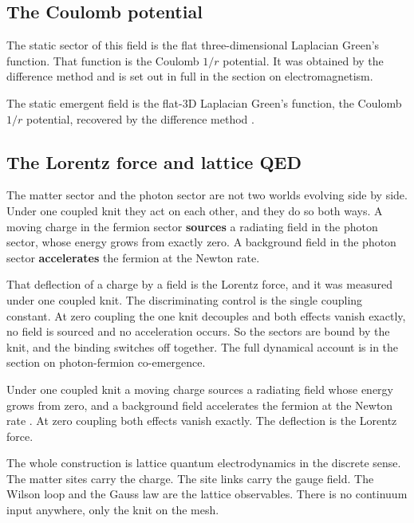 \subsection{The Coulomb potential}

The static sector of this field is the flat three-dimensional Laplacian Green's function. That function is the Coulomb $1/r$ potential. It was obtained by the difference method and is set out in full in the section on electromagnetism.

\begin{result}
The static emergent field is the flat-$3$D Laplacian Green's function, the Coulomb $1/r$ potential, recovered by the difference method \cite{pollard2026vibetest}.
\end{result}

\subsection{The Lorentz force and lattice QED}

The matter sector and the photon sector are not two worlds evolving side by side. Under one coupled knit they act on each other, and they do so both ways. A moving charge in the fermion sector \textbf{sources} a radiating field in the photon sector, whose energy grows from exactly zero. A background field in the photon sector \textbf{accelerates} the fermion at the Newton rate.

That deflection of a charge by a field is the Lorentz force, and it was measured under one coupled knit. The discriminating control is the single coupling constant. At zero coupling the one knit decouples and both effects vanish exactly, no field is sourced and no acceleration occurs. So the sectors are bound by the knit, and the binding switches off together. The full dynamical account is in the section on photon-fermion co-emergence.

\begin{result}
Under one coupled knit a moving charge sources a radiating field whose energy grows from zero, and a background field accelerates the fermion at the Newton rate \cite{pollard2026vibetest}. At zero coupling both effects vanish exactly. The deflection is the Lorentz force.
\end{result}

The whole construction is lattice quantum electrodynamics in the discrete sense. The matter sites carry the charge. The site links carry the gauge field. The Wilson loop and the Gauss law are the lattice observables. There is no continuum input anywhere, only the knit on the mesh.

